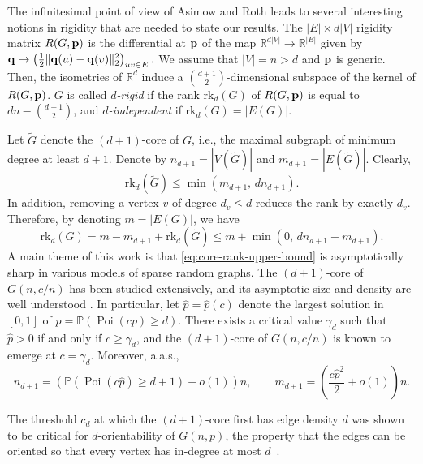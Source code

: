 \documentclass[reqno,english]{amsart}
\numberwithin{equation}{section}
\theoremstyle{definition}{
\newtheorem{example}[theorem]{Example}
\newtheorem{definition}[theorem]{Definition}
\newtheorem*{definition*}{Definition}
\newtheorem{problem}[theorem]{Problem}
\newtheorem{question}[theorem]{Question}
}
\renewcommand{\P}{\mathbb P}
\newcommand{\R}{\mathbb R}
\newcommand{\p}{{\bf p}}
\newcommand{\q}{{\bf q}}
\begin{document}
\medskip

The infinitesimal point of view of Asimow and Roth leads to several interesting notions in
rigidity that are needed to state our results. 
The \(|E|\times d|V|\) rigidity matrix \(R(G,\p)\) is the differential at \(\p\) of the map $\R^{d|V|}\to\R^{|E|}$ given by
\(
\q\mapsto \left(\frac12\|\q(u)-\q(v)\|_2^2\right)_{uv\in E}.
\)
We assume that $|V|=n>d$ and $\p$ is generic. Then, the isometries of $\R^d$ induce a $\binom{d+1}{2}$-dimensional subspace of the kernel of $R(G,\p)$.
\(G\) is called {\em \(d\)-rigid} if 
the rank $\mathrm{rk}_d(G)$ of $R(G,\p)$ is equal to
$dn-\binom{d+1}{2}$, and 
{\em $d$-independent} if $\mathrm{rk}_d(G)=|E(G)|$.

Let \(\tilde G\) denote the \((d+1)\)-core of \(G\), i.e., the maximal
subgraph of minimum degree at least \(d+1\). Denote by
$n_{d+1}=|V(\tilde G)|$ and $m_{d+1}=|E(\tilde G)|$.
Clearly,
\[
    \mathrm{rk}_d(\tilde G)
    \le \min\left(m_{d+1},\,dn_{d+1}\right).
\]
In addition, removing a vertex \(v\) of degree \(d_v\le d\) reduces
the rank by exactly \(d_v\). Therefore, by denoting $m=|E(G)|$, we have
\begin{equation}\label{eq:core-rank-upper-bound}
    \mathrm{rk}_d(G) = m-m_{d+1}+\mathrm{rk}_d(\tilde G)
    \le
    m+\min\left(0,\,dn_{d+1}-m_{d+1}\right).
\end{equation}
A main theme of this work is that \eqref{eq:core-rank-upper-bound} is asymptotically sharp in various models of sparse random graphs. The \((d+1)\)-core of \(G(n,c/n)\) has been studied
extensively, and its asymptotic size and density are well understood
\cite{PittelSpencerWormaldCore,JansonSimplekcore}. In particular,
let \(\hat p=\hat p(c)\) denote the largest solution in
\([0,1]\) of $p=\P(\operatorname{Poi}(cp)\ge d).$
There exists a critical value $\gamma_d$ such that $\hat p>0$ if and only if $c\ge \gamma_d$, and the $(d+1)$-core of $G(n,c/n)$ is known to emerge at $c=\gamma_d$. 
Moreover, a.a.s.,
\[
    n_{d+1}
    =
    \left(\P(\operatorname{Poi}(c\hat p)\ge d+1)+o(1)\right)n,
    \qquad
    m_{d+1}
    =
    \left(\frac{c\hat p^2}{2}+o(1)\right)n .
\]

The threshold \(c_d\) at which the \((d+1)\)-core
first has edge density \(d\) was shown to be
critical for \(d\)-orientability of \(G(n,p)\), the property
that the edges can be oriented so that every vertex has in-degree at most
\(d\)~\cite{CainSandersWormald,FernholzRamachandran}.
\end{document}

